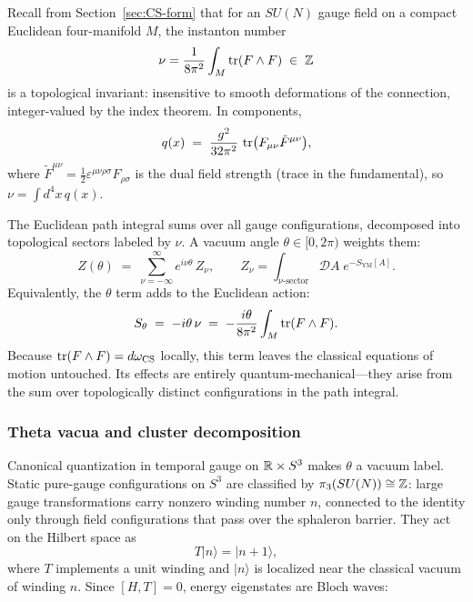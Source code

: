 Recall from Section~\ref{sec:CS-form} that for an $SU(N)$ gauge field on a compact Euclidean four-manifold $M$, the instanton number
\begin{equation}\label{eq:instanton-number}
  \nu = \frac{1}{8\pi^2}\int_M \operatorname{tr}(F\wedge F) \;\in\; \mathbb{Z}
\end{equation}
is a topological invariant: insensitive to smooth deformations of the connection, integer-valued by the index theorem. In components,
\begin{equation}\label{eq:topological-charge-density}
  q(x) \;=\; \frac{g^2}{32\pi^2}\,\operatorname{tr}\bigl(F_{\mu\nu}\tilde{F}^{\mu\nu}\bigr),
\end{equation}
where $\tilde{F}^{\mu\nu} = \frac{1}{2}\varepsilon^{\mu\nu\rho\sigma}F_{\rho\sigma}$ is the dual field strength (trace in the fundamental), so $\nu = \int d^4x\, q(x)$.

The Euclidean path integral sums over all gauge configurations, decomposed into topological sectors labeled by $\nu$. A vacuum angle $\theta\in[0,2\pi)$ weights them:
\begin{equation}\label{eq:theta-partition-function}
  Z(\theta) \;=\; \sum_{\nu=-\infty}^{\infty} e^{i\nu\theta}\,Z_\nu,
  \qquad Z_\nu = \int_{\nu\text{-sector}} \mathcal{D}A\; e^{-S_{\mathrm{YM}}[A]}.
\end{equation}
Equivalently, the $\theta$ term adds to the Euclidean action:
\begin{equation}\label{eq:theta-action}
  S_\theta \;=\; -i\theta\,\nu \;=\; -\frac{i\theta}{8\pi^2}\int_M \operatorname{tr}(F\wedge F).
\end{equation}
Because $\operatorname{tr}(F\wedge F) = d\omega_{\operatorname{CS}}$ locally, this term leaves the classical equations of motion untouched.  Its effects are entirely quantum-mechanical---they arise from the sum over topologically distinct configurations in the path integral.

\subsubsection{Theta vacua and cluster decomposition}

Canonical quantization in temporal gauge on $\mathbb{R}\times S^3$ makes $\theta$ a vacuum label. Static pure-gauge configurations on $S^3$ are classified by $\pi_3(SU(N))\cong\mathbb{Z}$: large gauge transformations carry nonzero winding number $n$, connected to the identity only through field configurations that pass over the sphaleron barrier.  They act on the Hilbert space as
\begin{equation}\label{eq:winding-sectors}
  T|n\rangle = |n+1\rangle,
\end{equation}
where $T$ implements a unit winding and $|n\rangle$ is localized near the classical vacuum of winding $n$.  Since $[H,T]=0$, energy eigenstates are Bloch waves:


